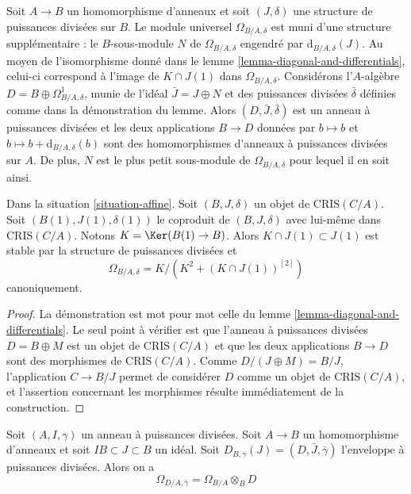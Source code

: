 \begin{remark}
\label{remark-filtration-differentials}
Soit $A \to B$ un homomorphisme d'anneaux et soit $(J, \delta)$ une structure de
puissances divisées sur $B$. Le module universel $\Omega_{B/A, \delta}$
est muni d'une structure supplémentaire : le $B$-sous-module
$N$ de $\Omega_{B/A, \delta}$ engendré par $\text{d}_{B/A, \delta}(J)$.
Au moyen de l'isomorphisme donné dans le
lemme \ref{lemma-diagonal-and-differentials},
celui-ci correspond à l'image de
$K \cap J(1)$ dans $\Omega_{B/A, \delta}$. Considérons l'$A$-algèbre
$D = B \oplus \Omega^1_{B/A, \delta}$, munie de l'idéal $\bar J = J \oplus N$
et des puissances divisées $\bar \delta$ définies comme dans la démonstration du lemme.
Alors $(D, \bar J, \bar \delta)$ est un anneau à puissances divisées
et les deux applications $B \to D$ données par $b \mapsto b$ et
$b \mapsto b + \text{d}_{B/A, \delta}(b)$
sont des homomorphismes d'anneaux à puissances divisées sur $A$. De plus, $N$
est le plus petit sous-module de $\Omega_{B/A, \delta}$ pour lequel il en soit ainsi.
\end{remark}

\begin{lemma}
\label{lemma-diagonal-and-differentials-affine-site}
Dans la situation \ref{situation-affine}.
Soit $(B, J, \delta)$ un objet de $\text{CRIS}(C/A)$.
Soit $(B(1), J(1), \delta(1))$ le coproduit de $(B, J, \delta)$
avec lui-même dans $\text{CRIS}(C/A)$. Notons
$K = \Ker(B(1) \to B)$. Alors $K \cap J(1) \subset J(1)$
est stable par la structure de puissances divisées et
$$
\Omega_{B/A, \delta} = K/ \left(K^2 + (K \cap J(1))^{[2]}\right)
$$
canoniquement.
\end{lemma}

\begin{proof}
La démonstration est mot pour mot celle du
lemme \ref{lemma-diagonal-and-differentials}.
Le seul point à vérifier est que l'anneau à
puissances divisées $D = B \oplus M$ est un objet de $\text{CRIS}(C/A)$
et que les deux applications $B \to D$ sont des morphismes de $\text{CRIS}(C/A)$.
Comme $D/(J \oplus M) = B/J$, l'application $C \to B/J$ permet de considérer
$D$ comme un objet de $\text{CRIS}(C/A)$,
et l'assertion concernant les morphismes résulte immédiatement de la construction.
\end{proof}

\begin{lemma}
\label{lemma-module-differentials-divided-power-envelope}
Soit $(A, I, \gamma)$ un anneau à puissances divisées. Soit $A \to B$ un homomorphisme
d'anneaux et soit $IB \subset J \subset B$ un idéal. Soit
$D_{B, \gamma}(J) = (D, \bar J, \bar \gamma)$ l'enveloppe à puissances divisées.
Alors on a
$$
\Omega_{D/A, \bar\gamma} = \Omega_{B/A} \otimes_B D
$$
\end{lemma}

